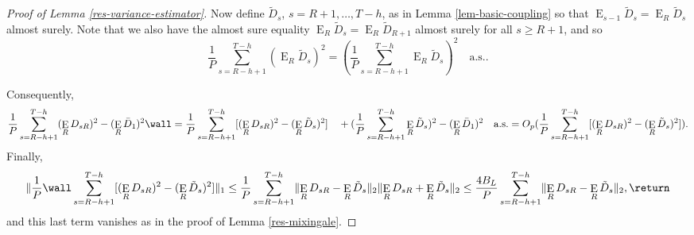 \documentclass[11pt]{article}
\DeclareMathOperator{\E}{E}
\newcommand{\oosSum}[2]{\ensuremath{\sum_{#1=R-\h+#2}^{T-\h}}}
\newcommand{\h}{h}
\begin{document}
\begin{proof}[Proof of Lemma \ref{res-variance-estimator}]
Now define $\tilde D_s$, $s = R+1,\dots,T-\h$, as in Lemma
\ref{lem-basic-coupling} so that $\E_{s-1} \tilde D_s = \E_R \tilde
D_s$ almost surely.  Note that we also have the almost sure equality
$\E_R \tilde D_s = \E_R \tilde D_{R+1}$ almost surely for all $s\geq R+1$,
and so
\[
\frac1P \oosSum{s}{1} (\E_R \tilde D_s)^2 = (\frac1P \oosSum{s}{1} \E_R
\tilde D_s)^2 \quad \text{a.s..}
\]

Consequently,
\[
\frac1P \oosSum{s}{1} (\E_R D_{sR})^2 - (\E_R\bar D_1)^2 \wall = 
\frac1P \oosSum{s}{1} [(\E_R D_{sR})^2 - (\E_R\tilde D_s)^2]\\
\quad+ (\frac1P \oosSum{s}{1} \E_R \tilde D_s)^2 - (\E_R\bar D_1)^2 \quad \text{a.s}.\\
= O_p(\frac1P \oosSum{s}{1} [(\E_R D_{sR})^2 - (\E_R \tilde D_s)^2]).
\]
Finally, 
\[
\lVert \frac1P \wall\oosSum{s}{1} [(\E_RD_{sR})^2 - (\E_R \tilde D_s)^2] \rVert_1
\\ \leq \frac1P \oosSum{s}{1} \lVert \E_RD_{sR} - \E_R \tilde D_s \rVert_2 \lVert
\E_RD_{sR} + \E_R \tilde D_s \rVert_2
\\ \leq \frac{4 B_L}P \oosSum{s}{1} \lVert \E_RD_{sR} - \E_R \tilde D_s \rVert_2,
\return
\]
and this last term vanishes as in the proof of Lemma
\ref{res-mixingale}.


\end{proof}
\end{document}
